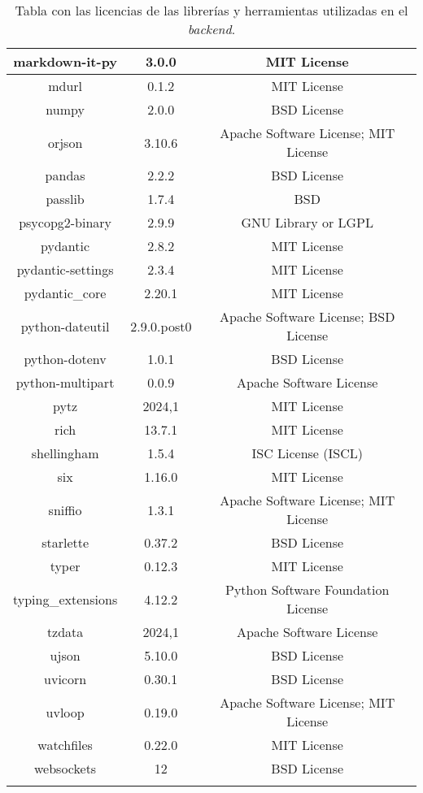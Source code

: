 \begin{longtable}{|c|c|c|}
		\hline
		markdown-it-py & 3.0.0 & MIT License \\
		\hline
		mdurl & 0.1.2 & MIT License \\
		\hline
		numpy & 2.0.0 & BSD License \\
		\hline
		orjson & 3.10.6 & Apache Software License; MIT License \\
		\hline
		pandas & 2.2.2 & BSD License \\
		\hline
		passlib & 1.7.4 & BSD \\
		\hline
		psycopg2-binary & 2.9.9 & GNU Library or LGPL \\
		\hline
		pydantic & 2.8.2 & MIT License \\
		\hline
		pydantic-settings & 2.3.4 & MIT License \\
		\hline
		pydantic\_core & 2.20.1 & MIT License \\
		\hline
		python-dateutil & 2.9.0.post0 & Apache Software License; BSD License \\
		\hline
		python-dotenv & 1.0.1 & BSD License \\
		\hline
		python-multipart & 0.0.9 & Apache Software License \\
		\hline
		pytz & 2024,1 & MIT License \\
		\hline
		rich & 13.7.1 & MIT License \\
		\hline
		shellingham & 1.5.4 & ISC License (ISCL) \\
		\hline
		six & 1.16.0 & MIT License \\
		\hline
		sniffio & 1.3.1 & Apache Software License; MIT License \\
		\hline
		starlette & 0.37.2 & BSD License \\
		\hline
		typer & 0.12.3 & MIT License \\
		\hline
		typing\_extensions & 4.12.2 & Python Software Foundation License \\
		\hline
		tzdata & 2024,1 & Apache Software License \\
		\hline
		ujson & 5.10.0 & BSD License \\
		\hline
		uvicorn & 0.30.1 & BSD License \\
		\hline
		uvloop & 0.19.0 & Apache Software License; MIT License \\
		\hline
		watchfiles & 0.22.0 & MIT License \\
		\hline
		websockets & 12 & BSD License \\
		\hline
		\caption{Tabla con las licencias de las librerías y herramientas utilizadas en el \textit{backend}.}
		\label{deps:back1}
	\end{longtable}

